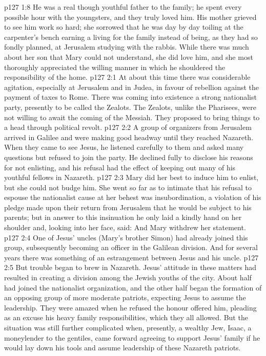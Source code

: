 \vs p127 1:8 He was a real though youthful father to the family; he spent every possible hour with the youngsters, and they truly loved him. His mother grieved to see him work so hard; she sorrowed that he was day by day toiling at the carpenter’s bench earning a living for the family instead of being, as they had so fondly planned, at Jerusalem studying with the rabbis. While there was much about her son that Mary could not understand, she did love him, and she most thoroughly appreciated the willing manner in which he shouldered the responsibility of the home.
\vs p127 2:1 At about this time there was considerable agitation, especially at Jerusalem and in Judea, in favour of rebellion against the payment of taxes to Rome. There was coming into existence a strong nationalist party, presently to be called the Zealots. The Zealots, unlike the Pharisees, were not willing to await the coming of the Messiah. They proposed to bring things to a head through political revolt.
\vs p127 2:2 A group of organizers from Jerusalem arrived in Galilee and were making good headway until they reached Nazareth. When they came to see Jesus, he listened carefully to them and asked many questions but refused to join the party. He declined fully to disclose his reasons for not enlisting, and his refusal had the effect of keeping out many of his youthful fellows in Nazareth.
\vs p127 2:3 Mary did her best to induce him to enlist, but she could not budge him. She went so far as to intimate that his refusal to espouse the nationalist cause at her behest was insubordination, a violation of his pledge made upon their return from Jerusalem that he would be subject to his parents; but in answer to this insinuation he only laid a kindly hand on her shoulder and, looking into her face, said:  And Mary withdrew her statement.
\vs p127 2:4 One of Jesus’ uncles (Mary’s brother Simon) had already joined this group, subsequently becoming an officer in the Galilean division. And for several years there was something of an estrangement between Jesus and his uncle.
\vs p127 2:5 But trouble began to brew in Nazareth. Jesus’ attitude in these matters had resulted in creating a division among the Jewish youths of the city. About half had joined the nationalist organization, and the other half began the formation of an opposing group of more moderate patriots, expecting Jesus to assume the leadership. They were amazed when he refused the honour offered him, pleading as an excuse his heavy family responsibilities, which they all allowed. But the situation was still further complicated when, presently, a wealthy Jew, Isaac, a moneylender to the gentiles, came forward agreeing to support Jesus’ family if he would lay down his tools and assume leadership of these Nazareth patriots.
